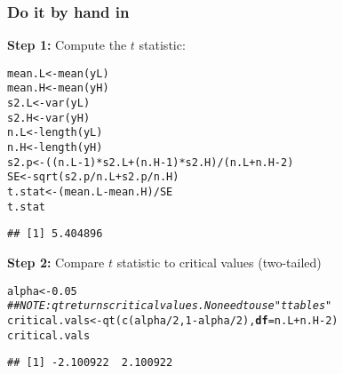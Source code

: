 \documentclass[color=usenames,dvipsnames]{beamer}\usepackage[]{graphicx}\usepackage[]{color}
\makeatletter
\newcommand{\hlnum}[1]{\textcolor[rgb]{0.69,0.494,0}{#1}}%
\newcommand{\hlcom}[1]{\textcolor[rgb]{0.514,0.506,0.514}{\textit{#1}}}%
\newcommand{\hlopt}[1]{\textcolor[rgb]{0,0,0}{#1}}%
\newcommand{\hlstd}[1]{\textcolor[rgb]{0,0,0}{#1}}%
\newcommand{\hlkwb}[1]{\textcolor[rgb]{0,0.341,0.682}{#1}}%
\newcommand{\hlkwc}[1]{\textcolor[rgb]{0,0,0}{\textbf{#1}}}%
\newcommand{\hlkwd}[1]{\textcolor[rgb]{0.004,0.004,0.506}{#1}}%
\newenvironment{kframe}{%
 \def\at@end@of@kframe{}%
 \ifinner\ifhmode%
  \def\at@end@of@kframe{\end{minipage}}%
  \begin{minipage}{\columnwidth}%
 \fi\fi%
 \def\FrameCommand##1{\hskip\@totalleftmargin \hskip-\fboxsep
 \colorbox{shadecolor}{##1}\hskip-\fboxsep
     \hskip-\linewidth \hskip-\@totalleftmargin \hskip\columnwidth}%
 \MakeFramed {\advance\hsize-\width
   \@totalleftmargin\z@ \linewidth\hsize
   \@setminipage}}%
 {\par\unskip\endMakeFramed%
 \at@end@of@kframe}
\newenvironment{knitrout}{}{} %
\makeatother
\begin{document}
\begin{frame}[fragile]
  \frametitle{Do it by hand in \R}
  {\bf Step 1:} Compute the $t$ statistic:
  \footnotesize
\begin{knitrout}\scriptsize
{}\color{fgcolor}\begin{kframe}
\begin{alltt}
\hlstd{mean.L} \hlkwb{<-} \hlkwd{mean}\hlstd{(yL)}
\hlstd{mean.H} \hlkwb{<-} \hlkwd{mean}\hlstd{(yH)}
\hlstd{s2.L} \hlkwb{<-} \hlkwd{var}\hlstd{(yL)}
\hlstd{s2.H} \hlkwb{<-} \hlkwd{var}\hlstd{(yH)}
\hlstd{n.L} \hlkwb{<-} \hlkwd{length}\hlstd{(yL)}
\hlstd{n.H} \hlkwb{<-} \hlkwd{length}\hlstd{(yH)}
\hlstd{s2.p} \hlkwb{<-} \hlstd{((n.L}\hlopt{-}\hlnum{1}\hlstd{)}\hlopt{*}\hlstd{s2.L} \hlopt{+} \hlstd{(n.H}\hlopt{-}\hlnum{1}\hlstd{)}\hlopt{*}\hlstd{s2.H)}\hlopt{/}\hlstd{(n.L}\hlopt{+}\hlstd{n.H}\hlopt{-}\hlnum{2}\hlstd{)}
\hlstd{SE} \hlkwb{<-} \hlkwd{sqrt}\hlstd{(s2.p}\hlopt{/}\hlstd{n.L} \hlopt{+} \hlstd{s2.p}\hlopt{/}\hlstd{n.H)}
\hlstd{t.stat} \hlkwb{<-} \hlstd{(mean.L} \hlopt{-} \hlstd{mean.H)} \hlopt{/} \hlstd{SE}
\hlstd{t.stat}
\end{alltt}
\begin{verbatim}
## [1] 5.404896
\end{verbatim}
\end{kframe}
\end{knitrout}
\pause
  \normalsize
  {\bf Step 2:} Compare $t$ statistic to critical values (two-tailed)
  \footnotesize
\begin{knitrout}\scriptsize
{}\color{fgcolor}\begin{kframe}
\begin{alltt}
\hlstd{alpha} \hlkwb{<-} \hlnum{0.05}
\hlcom{## NOTE: qt returns critical values. No need to use "t tables"}
\hlstd{critical.vals} \hlkwb{<-} \hlkwd{qt}\hlstd{(}\hlkwd{c}\hlstd{(alpha}\hlopt{/}\hlnum{2}\hlstd{,} \hlnum{1}\hlopt{-}\hlstd{alpha}\hlopt{/}\hlnum{2}\hlstd{),} \hlkwc{df}\hlstd{=n.L}\hlopt{+}\hlstd{n.H}\hlopt{-}\hlnum{2}\hlstd{)}
\hlstd{critical.vals}
\end{alltt}
\begin{verbatim}
## [1] -2.100922  2.100922
\end{verbatim}
\end{kframe}
\end{knitrout}
\end{frame}
\end{document}
